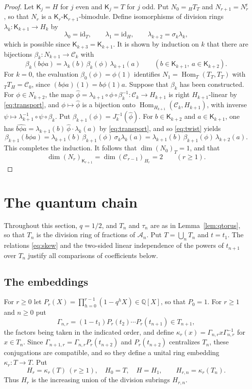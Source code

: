 \documentclass[11pt,a4paper]{amsart}
\numberwithin{equation}{section}
\newcommand{\Hom}{\operatorname{Hom}}
\newcommand{\Q}{\mathbb{Q}}
\newcommand{\C}{\mathcal{C}}
\newcommand{\Ksf}{\mathsf{K}}
\newcommand{\rr}{\mathrm{r}}
\begin{document}
\begin{proof}
Let $\Ksf_j=H$ for $j$ even and $\Ksf_j=T$ for $j$ odd. Put $N_0={}_HT_T$ and $N_{r+1}=N_r^{\rr}$, so that $N_r$ is a $\Ksf_r$-$\Ksf_{r+1}$-bimodule. Define isomorphisms of division rings $\lambda_k\colon\Ksf_{k+1}\to H_k$ by
\[
\lambda_0=\mathrm{id}_T,\qquad\lambda_1=\mathrm{id}_H,\qquad\lambda_{k+2}=\sigma_k\lambda_k,
\]
which is possible since $\Ksf_{k+3}=\Ksf_{k+1}$. It is shown by induction on $k$ that there are bijections $\beta_k\colon N_{k+1}\to\C_k$ with
\begin{equation}\label{eq:transport}
\beta_k(b\phi a)=\lambda_k(b)\,\beta_k(\phi)\,\lambda_{k+1}(a)\qquad(b\in\Ksf_{k+1},\ a\in\Ksf_{k+2}).
\end{equation}
For $k=0$, the evaluation $\beta_0(\phi)=\phi(1)$ identifies $N_1=\Hom_T(T_T,T_T)$ with ${}_TT_H=\C_0$, since $(b\phi a)(1)=b\phi(1)a$. Suppose that $\beta_k$ has been constructed. For $\phi\in N_{k+2}$, the map $\widehat\phi=\lambda_{k+1}\circ\phi\circ\beta_k^{-1}\colon\C_k\to H_{k+1}$ is right $H_{k+1}$-linear by \eqref{eq:transport}, and $\phi\mapsto\widehat\phi$ is a bijection onto $\Hom_{H_{k+1}}(\C_k,H_{k+1})$, with inverse $\psi\mapsto\lambda_{k+1}^{-1}\circ\psi\circ\beta_k$. Put $\beta_{k+1}(\phi)=J_k^{-1}(\widehat\phi)$. For $b\in\Ksf_{k+2}$ and $a\in\Ksf_{k+1}$, one has $\widehat{b\phi a}=\lambda_{k+1}(b)\,\widehat\phi\cdot\lambda_k(a)$ by \eqref{eq:transport}, and so \eqref{eq:twist} yields
\[
\beta_{k+1}(b\phi a)=\lambda_{k+1}(b)\,\beta_{k+1}(\phi)\,\sigma_k\lambda_k(a)=\lambda_{k+1}(b)\,\beta_{k+1}(\phi)\,\lambda_{k+2}(a).
\]
This completes the induction. It follows that $\dim(N_0)_T=1$, and that
\[
\dim(N_r)_{\Ksf_{r+1}}=\dim(\C_{r-1})_{H_r}=2\qquad(r\ge1).
\]
\end{proof}

\section{The quantum chain}\label{sec:chain}

Throughout this section, $q=1/2$, and $T_n$ and $\tau_n$ are as in Lemma~\ref{lem:qtorus}, so that $T_n$ is the division ring of fractions of $\mathcal A_n$. Put $T=\bigcup_nT_n$ and $t=t_1$. The relations \eqref{eq:skew} and the two-sided linear independence of the powers of $t_{n+1}$ over $T_n$ justify all comparisons of coefficients below.

\subsection{The embeddings}
For $r\ge0$ let $P_r(X)=\prod_{h=0}^{r-1}(1-q^hX)\in\Q[X]$, so that $P_0=1$. For $r\ge1$ and $n\ge0$ put
\[
\Gamma_{n,r}=(1-t_1)P_r(t_2)\cdots P_r(t_{n+1})\in T_{n+1},
\]
the factors being taken in the indicated order, and define $\kappa_r(x)=\Gamma_{n,r}x\Gamma_{n,r}^{-1}$ for $x\in T_n$. Since $\Gamma_{n+1,r}=\Gamma_{n,r}P_r(t_{n+2})$ and $P_r(t_{n+2})$ centralizes $T_n$, these conjugations are compatible, and so they define a unital ring embedding $\kappa_r\colon T\to T$. Put
\[
H_r=\kappa_r(T)\ (r\ge1),\quad H_0=T,\quad H=H_1,\qquad H_{r,n}=\kappa_r(T_n).
\]
Thus $H_r$ is the increasing union of the division subrings $H_{r,n}$.
\end{document}
